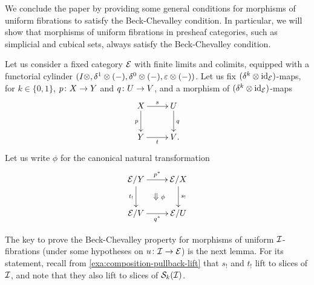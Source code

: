 \documentclass[reqno,10pt,a4paper,oneside,draft]{amsart}
\begin{document}
We conclude the paper by providing some general conditions for morphisms of uniform fibrations to satisfy the Beck-Chevalley condition.
In particular, we will show that morphisms of uniform fibrations in presheaf categories, such as simplicial and cubical sets, always satisfy the Beck-Chevalley condition.

\medskip

Let us consider a fixed category $\catE$ with finite limits and colimits, equipped with a functorial cylinder $(\interval \otimes, \rcyl \otimes (-), \lcyl \otimes (-), \ccyl \otimes (-))$.
Let us fix $(\kcyl \otimes \id_\catE)$-maps, for $k \in \{0 , 1\}$, $p \co X \to Y$ and $q \co U \to V$, and a morphism of $(\kcyl \otimes \id_\catE)$-maps
\begin{equation} \label{strong-h-equiv-base-change-along-fibration-BC:0}
\begin{gathered}
\xymatrix{
X \ar[r]^s \ar[d]_{p} & U \ar[d]^{q} \\
Y \ar[r]_t & V
\rlap{.}}
\end{gathered}
\end{equation}
Let us write $\phi$ for the canonical natural transformation
\begin{equation} \label{strong-h-equiv-base-change-along-fibration-BC:1}
\begin{gathered}
\xymatrix{
  \catE/Y
  \ar[r]^{p^*}
  \ar[d]_{t_!}
  \ar@{}[dr]|{\textstyle\Downarrow \rlap{$\labelstyle\phi$}}
&
  \catE/X
  \ar[d]^{s_!}
\\
  \catE/V
  \ar[r]_{q^*}
&
  \catE/U
}
\end{gathered}
\end{equation}

The key to prove the Beck-Chevalley property for morphisms of uniform $\cal{I}$-fibrations (under some hypotheses on $u \co \cal{I} \to \catE$) is the next lemma.
For its statement, recall from \cref{exa:composition-pullback-lift} that $s_!$ and $t_!$ lift to slices of $\cal{I}$, and note that they also lift to slices of $\cal{S}_k(\cal{I})$.
\end{document}
